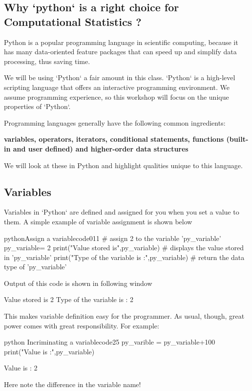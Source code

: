 \documentclass[11pt,a4paper]{report}
\begin{document}
\subsection{Why `python` is a right choice for Computational Statistics ?}

Python is a popular programming language in scientific computing, because it has many data-oriented feature packages that can speed up and simplify data processing, thus saving time.

We will be using `Python` a fair amount in this class. `Python` is a high-level scripting language that offers an interactive programming environment. We assume programming experience, so this workshop will focus on the unique properties of `Python`.

Programming languages generally have the following common ingredients: 

{\bf variables, operators, iterators, conditional statements, functions (built-in and user defined) and higher-order data structures}

We will look at these in Python and highlight qualities unique to this language.

\subsection*{Variables}
Variables in `Python` are defined and assigned for you when you set a value to them.
A simple example of variable assignment is shown below
\begin{codeInput}{python}{Assign a variable}{code01}{1}
# assign 2 to the variable 'py_variable'
py_variable= 2 
print("Value stored is",py_variable) # displays the value stored in 'py_variable'
print("Type of the variable is :",py_variable)  # return the data type of 'py_variable'
\end{codeInput}

Output of this code is shown in following window
\begin{result}
Value stored is 2
Type of the variable is : 2
\end{result}
This makes variable definition easy for the programmer. As usual, though, great power comes with great responsibility. For example:
\begin{codeInput}{python}{ Incriminating a variable}{code2}{5}
py_varible = py_variable+100
print("Value is :",py_variable)
\end{codeInput}
\begin{result}
Value is : 2
\end{result}
\begin{note}
Here note the difference in the variable name!
\end{note}
\end{document}
